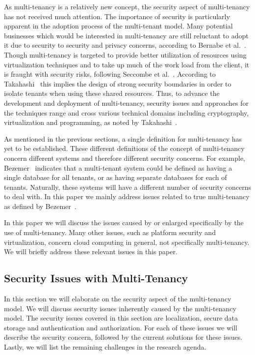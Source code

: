 As multi-tenancy is a relatively new concept, the security aspect of multi-tenancy has not received much attention. The importance of security is particularly apparent in the adoption process of the multi-tenant model. 
Many potential businesses which would be interested in multi-tenancy are still reluctant to adopt it due to security to security and privacy concerns, according to Bernabe et al.~\cite{Bernabe2012Auth}. 
Though multi-tenancy is targeted to provide better utilization of resources using virtualization techniques and to take up much of the work load from the client, it is fraught with security risks, following Seccombe et al.~\cite{Seccombe2009Security}. 
According to Takahashi~\cite{Takahashi2012Security} this implies the design of strong security boundaries in order to isolate tenants when using these shared resources. 
Thus, to advance the development and deployment of multi-tenancy, security issues and approaches for the techniques range and cross various technical domains including cryptography, virtualization and programming, as noted by Takahashi~\cite{Takahashi2012Security}.

As mentioned in the previous sections, a single definition for multi-tenancy has yet to be established. 
These different definitions of the concept of multi-tenancy concern different systems and therefore different security concerns.
For example, Bezemer~\cite{bezemer2010multi} indicates that a multi-tenant system could be defined as having a single database for all tenants, or as having separate databases for each of tenants. 
Naturally, these systems will have a different number of security concerns to deal with. In this paper we mainly address issues related to true multi-tenancy as defined by Bezemer~\cite{bezemer2010multi}.

In this paper we will discuss the issues caused by or enlarged specifically by the use of multi-tenancy. 
Many other issues, such as platform security and virtualization, concern cloud computing in general, not specifically multi-tenancy. 
We will briefly address these relevant issues in this paper. 

\subsection{Security Issues with Multi-Tenancy}
In this section we will elaborate on the security aspect of the multi-tenancy model. 
We will discuss security issues inherently caused by the multi-tenancy model.
The security issues covered in this section are localization, secure data storage and authentication and authorization.
For each of these issues we will describe the security concern, followed by the current solutions for these issues. 
Lastly, we will list the remaining challenges in the research agenda.

